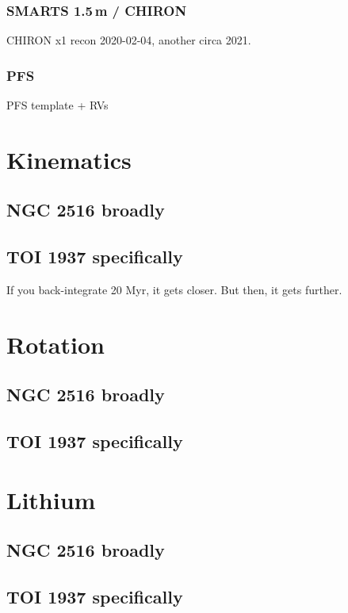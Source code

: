 \documentclass[12pt,twocolumn,tighten]{aastex63}
\begin{document}
  \subsubsection{SMARTS 1.5$\,$m / CHIRON}
  \label{subsec:chiron}
  CHIRON x1 recon 2020-02-04, another circa 2021.

  \subsubsection{PFS}
  PFS template + RVs


\section{Kinematics}

  \subsection{NGC 2516 broadly}
  \subsection{TOI 1937 specifically}
  If you back-integrate 20 Myr, it gets closer. But then, it gets
  further.

\section{Rotation}

  \subsection{NGC 2516 broadly}
  \subsection{TOI 1937 specifically}

\section{Lithium}

  \subsection{NGC 2516 broadly}
  \subsection{TOI 1937 specifically}
\end{document}
